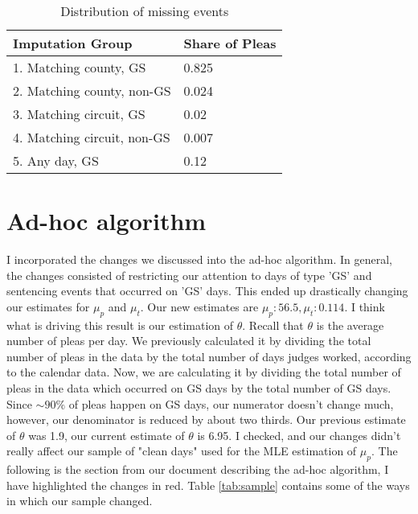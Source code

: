 \documentclass[11pt]{article}
\begin{document}
  \begin{table}[H]
      \centering
      \caption{Distribution of missing events}
      \label{tab:imp}
      \begin{tabular}{|l|l|}
      \hline
      \textbf{Imputation Group}   & \textbf{Share of Pleas} \\ \hline
      1. Matching county, GS      & 0.825                   \\ \hline
      2. Matching county, non-GS  & 0.024                   \\ \hline
      3. Matching circuit, GS     & 0.02                    \\ \hline
      4. Matching circuit, non-GS & 0.007                   \\ \hline
      5. Any day, GS              & 0.12                    \\ \hline
      \end{tabular}
  \end{table}

\section{Ad-hoc algorithm}
  I incorporated the changes we discussed into the ad-hoc algorithm. In general, the changes consisted of
  restricting our attention to days of type 'GS' and sentencing events that occurred on 'GS' days. This ended up drastically changing our estimates for $\mu_p$ and $\mu_t$. Our new estimates are $\mu_p: 56.5, \mu_t: 0.114$. I think what is driving this result is our estimation of $\theta$. Recall that $\theta$ is the average number of pleas per day. We previously calculated it by dividing the total number of pleas in the data by the total number of days judges worked, according to the calendar data. Now, we are calculating it by dividing the total number of pleas in the data which occurred on GS days by the total number of GS days. Since $\sim 90\%$ of pleas happen on GS days, our numerator doesn't change much, however, our denominator is reduced by about two thirds. Our previous estimate of $\theta$ was 1.9, our current estimate of $\theta$ is 6.95. I checked, and our changes didn't really affect our sample of "clean days" used for the MLE estimation of $\mu_p$. The following is the section from our document describing the ad-hoc algorithm, I have highlighted the changes in red. Table \ref{tab:sample} contains some of the ways in which our sample changed. 
\end{document}
